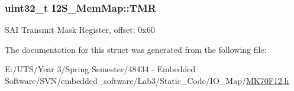 \subsubsection[{T\+M\+R}]{\setlength{\rightskip}{0pt plus 5cm}uint32\+\_\+t I2\+S\+\_\+\+Mem\+Map\+::\+T\+M\+R}\label{struct_i2_s___mem_map_a52b2dd69044a5f8c990749c314664ae1}
S\+A\+I Transmit Mask Register, offset\+: 0x60 

The documentation for this struct was generated from the following file\+:\begin{DoxyCompactItemize}
\item 
E\+:/\+U\+T\+S/\+Year 3/\+Spring Semester/48434 -\/ Embedded Software/\+S\+V\+N/embedded\+\_\+software/\+Lab3/\+Static\+\_\+\+Code/\+I\+O\+\_\+\+Map/\hyperlink{_m_k70_f12_8h}{M\+K70\+F12.\+h}\end{DoxyCompactItemize}
